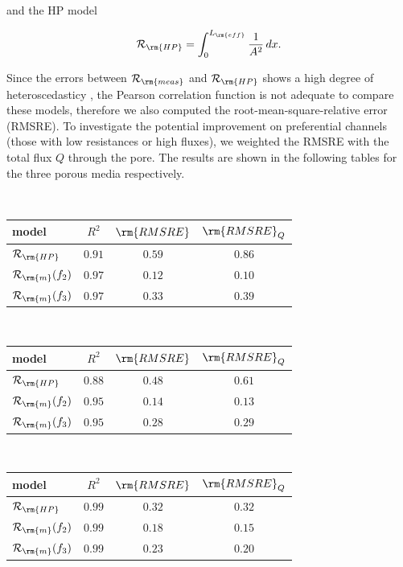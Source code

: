 \documentclass[draft,jgrga]{agutexSI2019}
\begin{document}
\begin{article}
and the HP model 

\begin{equation}
	\mathcal{R}_{\rm{HP}} = \int^{L_{\rm{eff}}}_{0}\frac{1}{A^2}\,dx.
\end{equation}

Since the errors between $\mathcal{R}_{\rm{meas}}$ and $\mathcal{R}_{\rm{HP}}$ shows a high degree of heteroscedasticy \cite{wilcox_comparing_2009}, the Pearson correlation function is not adequate to compare these models, therefore we also computed the root-mean-square-relative error (RMSRE). To investigate the potential improvement on preferential channels (those with low resistances or high fluxes), we weighted the RMSRE with the total flux $Q$ through the pore. The results are shown in the following tables for the three porous media respectively. 

\\
\begin{tabular}{l|c|c|c}
\hline
model & $R^2$  & $\rm{RMSRE}$ & $\rm{RMSRE}_Q$  \\
\hline
$\mathcal{R}_{\rm{HP}}$ 	& $0.91$ & $0.59$ & $0.86$\\
$\mathcal{R}_{\rm{m}}(f_2)$	& $0.97$ & $0.12$ & $0.10$\\
$\mathcal{R}_{\rm{m}}(f_3)$	& $0.97$ & $0.33$ & $0.39$\\
\end{tabular}

\vspace{1cm}

\\
\begin{tabular}{l|c|c|c}
\hline
model & $R^2$  & $\rm{RMSRE}$ & $\rm{RMSRE}_Q$  \\
\hline
$\mathcal{R}_{\rm{HP}}$ 	& $0.88$ & $0.48$ & $0.61$\\
$\mathcal{R}_{\rm{m}}(f_2)$	& $0.95$ & $0.14$ & $0.13$\\
$\mathcal{R}_{\rm{m}}(f_3)$	& $0.95$ & $0.28$ & $0.29$\\
\end{tabular}

\vspace{1cm}
\\
\begin{tabular}{l|c|c|c}
\hline
model & $R^2$  & $\rm{RMSRE}$ & $\rm{RMSRE}_Q$  \\
\hline
$\mathcal{R}_{\rm{HP}}$ 	& $0.99$ & $0.32$ & $0.32$\\
$\mathcal{R}_{\rm{m}}(f_2)$	& $0.99$ & $0.18$ & $0.15$\\
$\mathcal{R}_{\rm{m}}(f_3)$	& $0.99$ & $0.23$ & $0.20$\\
\end{tabular}





\end{article}
\end{document}
